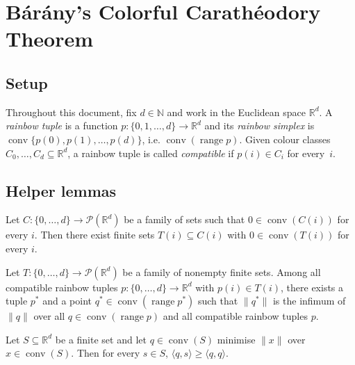 
\section*{Bárány's Colorful Carathéodory Theorem}

\subsection*{Setup}

Throughout this document, fix \(d \in \mathbb{N}\) and work in the
Euclidean space \(\mathbb{R}^d\). A \emph{rainbow tuple} is a function
\(p : \{0, 1, \dots, d\} \to \mathbb{R}^d\) and its \emph{rainbow
simplex} is \(\operatorname{conv}\{p(0), p(1), \dots, p(d)\}\),
i.e. \(\operatorname{conv}(\operatorname{range} p)\). Given colour
classes \(C_0, \dots, C_d \subseteq \mathbb{R}^d\), a rainbow tuple is
called \emph{compatible} if \(p(i) \in C_i\) for every~\(i\).

\subsection*{Helper lemmas}

\begin{lemma}
\label{lem:cc_finite_reduction}
Let \(C : \{0,\dots,d\} \to \mathcal{P}(\mathbb{R}^d)\) be a family of
sets such that \(0 \in \operatorname{conv}(C(i))\) for every \(i\).
Then there exist finite sets \(T(i) \subseteq C(i)\) with
\(0 \in \operatorname{conv}(T(i))\) for every \(i\).
\end{lemma}

\begin{lemma}
\label{lem:cc_min_simplex}
Let \(T : \{0,\dots,d\} \to \mathcal{P}(\mathbb{R}^d)\) be a family of
nonempty finite sets. Among all compatible rainbow tuples
\(p : \{0,\dots,d\} \to \mathbb{R}^d\) with \(p(i) \in T(i)\), there
exists a tuple \(p^{*}\) and a point
\(q^{*} \in \operatorname{conv}(\operatorname{range} p^{*})\) such that
\(\|q^{*}\|\) is the infimum of \(\|q\|\) over all
\(q \in \operatorname{conv}(\operatorname{range} p)\) and all compatible
rainbow tuples \(p\).
\end{lemma}

\begin{lemma}
\label{lem:cc_kkt}
Let \(S \subseteq \mathbb{R}^d\) be a finite set and let
\(q \in \operatorname{conv}(S)\) minimise \(\|x\|\) over
\(x \in \operatorname{conv}(S)\). Then for every \(s \in S\),
\(\langle q, s \rangle \ge \langle q, q \rangle\).
\end{lemma}

